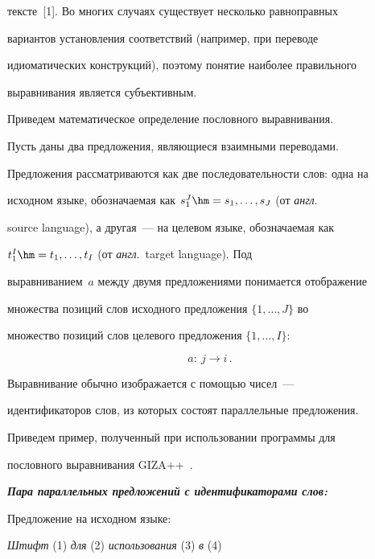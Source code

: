 тексте~[1]. Во многих случаях существует несколько равноправных


вариантов установления соответствий (например, при переводе


идиоматических конструкций), поэтому понятие наиболее правильного


выравнивания является субъективным.





     Приведем математическое определение пословного выравнивания.


Пусть даны два предложения, являющиеся взаимными переводами.


Предложения рассматриваются как две последовательности слов: одна на


исходном языке, обозначаемая как $s_1^J\hm= s_1,\ldots ,s_J$ (от \textit{англ}.\


{source language}), а другая~--- на целевом языке, обозначаемая как


$t_1^I\hm= t_1, \ldots , t_I$ (от \textit{англ}.\ {target language}). Под


выравниванием~$a$ между двумя предложениями понимается отображение


множества позиций слов исходного предложения $\{1,\ldots , J\}$ во


множество позиций слов целевого предложения $\{1,\ldots , I\}$:


     $$


     a:\ j\to i\,.


     $$





     Выравнивание обычно изображается с помощью чисел~---


идентификаторов слов, из которых состоят параллельные предложения.


Приведем пример, полученный при использовании программы для


пословного выравнивания GIZA++~\cite{2-m}.





{\bfseries\textit{Пара параллельных предложений с идентификаторами слов:}}





     Предложение на исходном языке:





     \textit{Штифт} (1) \textit{для} (2) \textit{использования} (3) \textit{в} (4)


